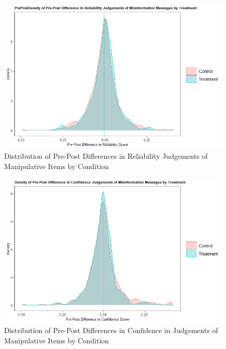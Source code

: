 \documentclass[empirical, authordate]{jote-new-article}
\begin{document}
\begin{figure}[h!]

  \includegraphics[width=\linewidth]{media/supplement/images1.jpeg}
  \caption{Distribution of Pre-Post Differences in Reliability Judgements of Manipulative Items by Condition}
  \label{fig:figS1}
\end{figure}




\begin{figure}[h!]

  \includegraphics[width=\linewidth]{media/supplement/images2.jpeg}
  \caption{Distribution of Pre-Post Differences in Confidence in Judgements of Manipulative Items by Condition}
  \label{fig:figS2}


\end{figure}
\end{document}
